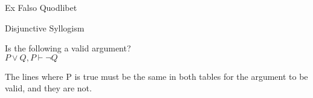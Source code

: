 \documentclass[12pt,letterpaper]{phi201}
\begin{document}


 Ex Falso Quodlibet \\
\begin{logicproof}
\end{logicproof}

 Disjunctive Syllogism \\
\begin{logicproof}
\end{logicproof}


 Is the following a valid argument? \\
$P \lor Q, P \vdash \neg Q$ \\
\noindent{}
\begin{multicols}{2}
    \begin{logictable}{5}{2}{1}
    \end{logictable}
    \columnbreak

    \begin{logictable}{4}{2}{0}
    \end{logictable}
\end{multicols}
\vspace*{-18pt}
\noindent The lines where P is true must be the same in both tables for the argument to be valid, and they are not. \\ \\
\end{document}
